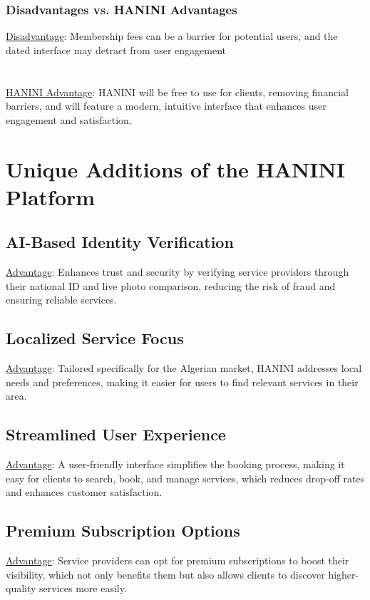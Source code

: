 \documentclass[12pt,a4paper]{report}
\begin{document}
\subsection*{Disadvantages vs. HANINI Advantages}
\underline {Disadvantage}: Membership fees can be a barrier for potential users, and the dated interface may detract from user engagement\\
\textbf{                      }\\
\textbf{                      }\\
\underline {HANINI Advantage}:  HANINI will be free to use for clients, removing financial barriers, and will feature a modern, intuitive interface that enhances user engagement and satisfaction.
\chapter{Unique Additions of the HANINI Platform}
\section{AI-Based Identity Verification}
\underline {Advantage}: Enhances trust and security by verifying service providers through their national ID and live photo comparison, reducing the risk of fraud and ensuring reliable services.

\section{Localized Service Focus}
\underline {Advantage}: Tailored specifically for the Algerian market, HANINI addresses local needs and preferences, making it easier for users to find relevant services in their area.

\section{Streamlined User Experience}
\underline {Advantage}:  A user-friendly interface simplifies the booking process, making it easy for clients to search, book, and manage services, which reduces drop-off rates and enhances customer satisfaction.


\section{Premium Subscription Options}
\underline {Advantage}:  Service providers can opt for premium subscriptions to boost their visibility, which not only benefits them but also allows clients to discover higher-quality services more easily.
\end{document}
